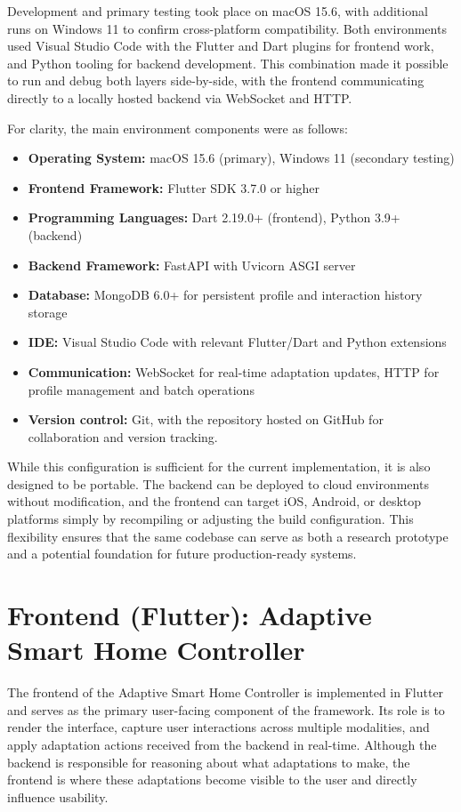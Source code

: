 Development and primary testing took place on macOS 15.6, with additional runs on Windows 11 to confirm cross-platform compatibility. Both environments used Visual Studio Code with the Flutter and Dart plugins for frontend work, and Python tooling for backend development. This combination made it possible to run and debug both layers side-by-side, with the frontend communicating directly to a locally hosted backend via WebSocket and HTTP.

For clarity, the main environment components were as follows:
\begin{itemize}
    \item \textbf{Operating System:} macOS 15.6 (primary), Windows 11 (secondary testing)
    \item \textbf{Frontend Framework:} Flutter SDK 3.7.0 or higher
    \item \textbf{Programming Languages:} Dart 2.19.0+ (frontend), Python 3.9+ (backend)
    \item \textbf{Backend Framework:} FastAPI with Uvicorn ASGI server
    \item \textbf{Database:} MongoDB 6.0+ for persistent profile and interaction history storage
    \item \textbf{IDE:} Visual Studio Code with relevant Flutter/Dart and Python extensions
    \item \textbf{Communication:} WebSocket for real-time adaptation updates, HTTP for profile management and batch operations
    \item \textbf{Version control:} Git, with the repository hosted on GitHub for collaboration and version tracking.
\end{itemize}

While this configuration is sufficient for the current implementation, it is also designed to be portable. The backend can be deployed to cloud environments without modification, and the frontend can target iOS, Android, or desktop platforms simply by recompiling or adjusting the build configuration. This flexibility ensures that the same codebase can serve as both a research prototype and a potential foundation for future production-ready systems.

\section{Frontend (Flutter): Adaptive Smart Home Controller}
The frontend of the Adaptive Smart Home Controller is implemented in Flutter and serves as the primary user-facing component of the framework. Its role is to render the interface, capture user interactions across multiple modalities, and apply adaptation actions received from the backend in real-time. Although the backend is responsible for reasoning about what adaptations to make, the frontend is where these adaptations become visible to the user and directly influence usability.

